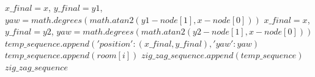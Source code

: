 \begin{algorithm}[H]
\begin{algorithmic}[1]
                        \State $x\_final = x$, $y\_final = y1$, $yaw = math.degrees(math.atan2(y1-node[1], x-node[0]))$
                    \Else
                         \State $x\_final = x$, $y\_final = y2$, $yaw = math.degrees(math.atan2(y2-node[1], x-node[0]))$
                    \EndIf
                \EndIf
                    \State $temp\_sequence.append({'position': (x\_final,y\_final), 'yaw': yaw})$
                \EndIf
                \State $temp\_sequence.append(room[i])$
            \EndFor
            \State $zig\_zag\_sequence.append(temp\_sequence)$
        \EndFor
        \State \Return $zig\_zag\_sequence$
\end{algorithmic}
\end{algorithm}